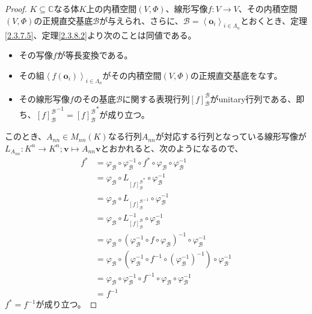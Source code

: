 \documentclass[dvipdfmx]{jsarticle}
\begin{document}
\begin{proof}
$K \subseteq \mathbb{C}$なる体$K$上の内積空間$(V,\varPhi)$、線形写像$f:V \rightarrow V$、その内積空間$(V,\varPhi)$の正規直交基底$\mathcal{B}$が与えられ、さらに、$\mathcal{B}=\left\langle \mathbf{o}_{i} \right\rangle_{i \in \varLambda_{n}}$とおくとき、定理\ref{2.3.7.5}、定理\ref{2.3.8.2}より次のことは同値である。
\begin{itemize}
\item
  その写像$f$が等長変換である。
\item
  その組$\left\langle f\left( \mathbf{o}_{i} \right) \right\rangle_{i \in \varLambda_{n}}$がその内積空間$(V,\varPhi)$の正規直交基底をなす。
\item
  その線形写像$f$のその基底$\mathcal{B}$に関する表現行列$[ f]_{\mathcal{B}}^{\mathcal{B}}$がunitary行列である、即ち、${[ f]_{\mathcal{B}}^{\mathcal{B}}}^{- 1} = {[ f]_{\mathcal{B}}^{\mathcal{B}}}^{*}$が成り立つ。
\end{itemize}\par
このとき、$A_{nn} \in M_{nn}(K)$なる行列$A_{nn}$が対応する行列となっている線形写像が$L_{A_{nn}}:K^{n} \rightarrow K^{n};\mathbf{v} \mapsto A_{nn}\mathbf{v}$とおかれると、次のようになるので、
\begin{align*}
f^{*} &= \varphi_{\mathcal{B}} \circ \varphi_{\mathcal{B}}^{- 1} \circ f^{*} \circ \varphi_{\mathcal{B}} \circ \varphi_{\mathcal{B}}^{- 1}\\
&= \varphi_{\mathcal{B}} \circ L_{{[ f]_{\mathcal{B}}^{\mathcal{B}}}^{*}} \circ \varphi_{\mathcal{B}}^{- 1}\\
&= \varphi_{\mathcal{B}} \circ L_{{[ f]_{\mathcal{B}}^{\mathcal{B}}}^{- 1}} \circ \varphi_{\mathcal{B}}^{- 1}\\
&= \varphi_{\mathcal{B}} \circ L_{[ f]_{\mathcal{B}}^{\mathcal{B}}}^{- 1} \circ \varphi_{\mathcal{B}}^{- 1}\\
&= \varphi_{\mathcal{B}} \circ \left( \varphi_{\mathcal{B}}^{- 1} \circ f \circ \varphi_{\mathcal{B}} \right)^{- 1} \circ \varphi_{\mathcal{B}}^{- 1}\\
&= \varphi_{\mathcal{B}} \circ \left( \varphi_{\mathcal{B}}^{- 1} \circ f^{- 1} \circ \left( \varphi_{\mathcal{B}}^{- 1} \right)^{- 1} \right) \circ \varphi_{\mathcal{B}}^{- 1}\\
&= \varphi_{\mathcal{B}} \circ \varphi_{\mathcal{B}}^{- 1} \circ f^{- 1} \circ \varphi_{\mathcal{B}} \circ \varphi_{\mathcal{B}}^{- 1}\\
&= f^{- 1}
\end{align*}
$f^{*} = f^{- 1}$が成り立つ。\par

\end{proof}
\end{document}
